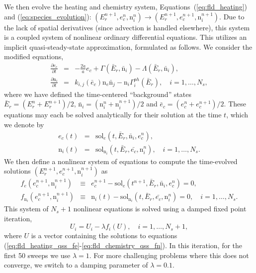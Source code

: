 We then evolve the heating and chemistry system,
Equations~(\ref{eq:fld_heating}) and (\ref{eq:species_evolution}):
$(E_r^{n+1}, e_c^n, {\mathrm n}_i^n) \to (E_r^{n+1}, e_c^{n+1},
{\mathrm n}_i^{n+1})$.  Due to the lack of spatial derivatives (since
advection is handled elsewhere), this system is a coupled system of
nonlinear ordinary differential equations.  This utilizes an implicit
quasi-steady-state approximation, formulated as follows.  We consider
the modified equations,
\begin{eqnarray}
  \label{eq:fld_heating_qss}
  \frac{\partial e_c}{\partial t} &=& -\frac{2\dot{a}}{a} e_c +
    \Gamma\left(\bar{E}_r,\bar{\mathrm n}_i\right) - 
    \Lambda\left(\bar{E}_r,\bar{\mathrm n}_i\right), \\
  \label{eq:fld_chemistry_qss}
  \frac{\partial {\mathrm n}_i}{\partial t} &=& k_{i,j}\left(\bar{e}_c\right)
    {\mathrm n}_e \bar{\mathrm n}_j - {\mathrm n}_i 
    \Gamma_i^{ph}\left(\bar{E}_r\right), \quad i=1,\ldots,N_s,
\end{eqnarray}
where we have defined the time-centered ``background'' states
$\bar{E}_r = \left(E_r^{n}+E_r^{n+1}\right)/2$, 
$\bar{\mathrm n}_i = \left({\mathrm n}_i^{n}+{\mathrm n}_i^{n+1}\right)/2$
and $\bar{e}_c = \left(e_c^{n}+e_c^{n+1}\right)/2$.  These equations
may each be solved analytically for their solution at the time
$t$, which we denote by
\begin{eqnarray}
  \label{eq:fld_heating_qss_sol}
  e_c(t) &=& \text{sol}_{e}\left(t,\bar{E}_r,\bar{\mathrm n}_i,e_c^n\right), \\
  \label{eq:fld_chemistry_qss_sol}
  {\mathrm n}_i(t) &=& \text{sol}_{\mathrm n_i}
  \left(t,\bar{E}_r,\bar{e_c},\mathrm n_i^n\right), \quad i=1,\ldots,N_s. 
\end{eqnarray}
We then define a nonlinear system of equations to compute the
time-evolved solutions $\left(E_r^{n+1}, e_c^{n+1}, 
{\mathrm n}_i^{n+1}\right)$ as
\begin{eqnarray}
  \label{eq:fld_heating_qss_fe}
  f_e(e_c^{n+1},{\mathrm n}_i^{n+1}) &\equiv& e_c^{n+1} -
    \text{sol}_{e}\left(t^{n+1},\bar{E}_r,\bar{\mathrm n}_i,e_c^n\right)
    = 0, \\
  \label{eq:fld_chemistry_qss_fn}
  f_{\mathrm n_i}(e_c^{n+1},{\mathrm n}_i^{n+1}) &\equiv& 
    {\mathrm n}_i(t) - \text{sol}_{\mathrm n_i}
    \left(t,\bar{E}_r,\bar{e_c},\mathrm n_i^n\right)=0, \quad
    i=1,\ldots,N_s.  
\end{eqnarray}
This system of $N_s+1$ nonlinear equations is solved using a damped
fixed point iteration, 
\[
   U_i = U_i - \lambda f_i(U), \quad i=1,\ldots,N_s+1,
\]
where $U$ is a vector containing the solutions to equations
(\ref{eq:fld_heating_qss_fe}-\ref{eq:fld_chemistry_qss_fn}).  In this
iteration, for the first 50 sweeps we use $\lambda=1$. For more
challenging problems where this does not converge, we switch to a
damping parameter of $\lambda=0.1$.
